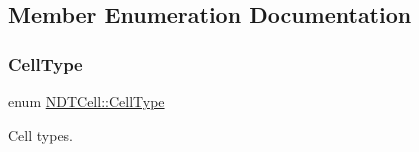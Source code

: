 \subsection{Member Enumeration Documentation}
\mbox{\label{classNDTCell_abd36cc88f0ef7145a126ed0058ea2f6e}} 
\subsubsection{\texorpdfstring{Cell\+Type}{CellType}}
{\footnotesize\ttfamily enum \hyperlink{classNDTCell_abd36cc88f0ef7145a126ed0058ea2f6e}{N\+D\+T\+Cell\+::\+Cell\+Type}}



Cell types. 

